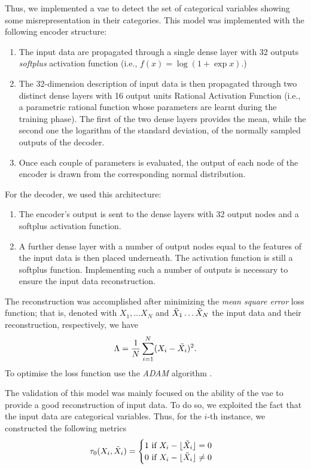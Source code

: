 Thus, we implemented a \gls{vae} to detect the set of categorical variables showing some misrepresentation in their categories.
This model was implemented with the following encoder structure:
\begin{enumerate}
    \item The input data are propagated through a single dense layer with  32 outputs \emph{softplus} activation function (i.e., $f(x) = \log{(1+\exp{x})}$.)

    \item The 32-dimension description of input data is then propagated through two distinct dense layers with 16 output units Rational Activation Function \cite[]{boulle2020rational} (i.e., a parametric rational function whose parameters are learnt during the training phase).
    The first of the two dense layers provides the mean, while the second one the logarithm of the standard deviation, of the normally sampled outputs of the decoder.

    \item Once each couple of parameters is evaluated, the output of each node of the encoder is drawn from the corresponding normal distribution. 
\end{enumerate}
For the decoder, we used this architecture:
\begin{enumerate}
    \item The encoder's output is sent to the dense layers with 32 output nodes and a softplus activation function.

    \item A further dense layer with a number of output nodes equal to the features of the input data is then placed underneath. The activation function is still a softplus function.
    Implementing such a number of outputs is necessary to ensure the input data reconstruction.
\end{enumerate}

The reconstruction was accomplished after minimizing the \emph{mean square error} loss function; that is, denoted with $X_1, \dots X_N$ and $\Tilde{X}_1 \dots \Tilde{X}_N$ the input data and their reconstruction, respectively, we have
\begin{equation}
    \Lambda = \frac{1}{N} \sum_{i = 1}^{N} (X_{i}-\Tilde{X_{i}})^{2}.
\end{equation}
To optimise the loss function use the \emph{ADAM} algorithm \cite[]{kingma2014adam}.

The validation of this model was mainly focused on the ability of the \gls{vae} to provide a good reconstruction of input data.
To do so, we exploited the fact that the input data are categorical variables. 
Thus, for the $i$-th instance, we constructed the following metrics
\begin{equation}
    \tau_0(X_{i}, \Tilde{X}_{i}) = 
    \begin{cases}
        1 ~\text{if~} X_{i}-\lfloor{\Tilde{X}_{i}}\rfloor = 0\\

        0 ~\text{if~} X_{i}-\lfloor{\Tilde{X}_{i}}\rfloor \neq 0\\
    \end{cases}
\end{equation}

